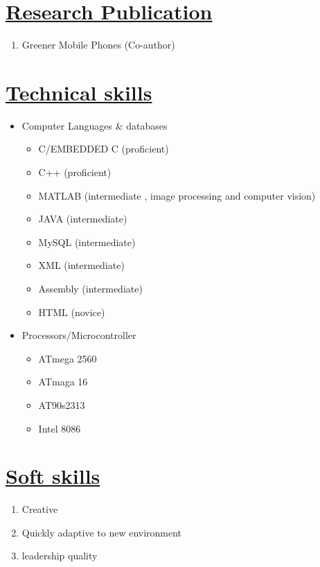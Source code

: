 \documentclass[14pt,a4paper,twoside]{article}
\begin{document}
		
	\section*{\underline{\textbf{Research Publication}}}
		\begin{enumerate}
			\item Greener Mobile Phones (Co-author)
		\end{enumerate}
	
	\section*{\underline{\textbf{Technical skills}}}
		\begin{itemize}
			\item Computer Languages \& databases
			\begin{itemize}
				\item C/EMBEDDED C		(proficient)
				\item C++				(proficient)
				\item MATLAB			(intermediate , image processing and computer vision)
				\item JAVA				(intermediate)
				\item MySQL				(intermediate)
				\item XML				(intermediate)
				\item Assembly 			(intermediate)
				\item HTML				(novice)	
			\end{itemize}
		\item Processors/Microcontroller
		\begin{itemize}
			\item ATmega 2560		
			\item ATmaga 16
			\item AT90s2313
			\item Intel 8086					
		\end{itemize}
		
		\end{itemize}
		
	\section*{\underline{\textbf{Soft skills}}}
		\begin{enumerate}
			\item Creative
			\item Quickly adaptive to new environment
			\item leadership quality
			
		\end{enumerate}
		
\end{document}
